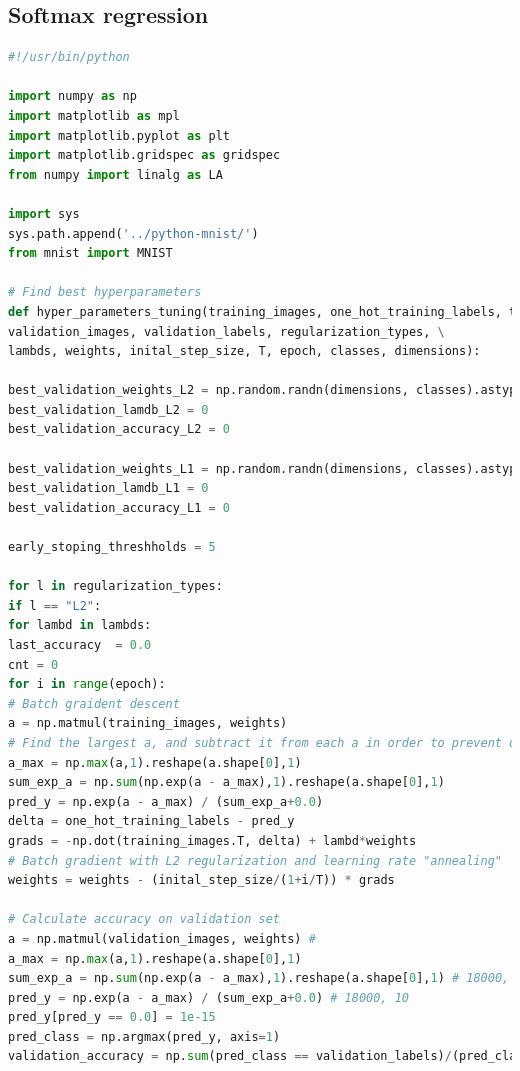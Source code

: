 \documentclass{article} %
\begin{document}
{\begin{lstlisting}[language=Python]
\end{lstlisting}

\subsection{Softmax regression}
\begin{lstlisting}[language=Python]
#!/usr/bin/python 

import numpy as np
import matplotlib as mpl
import matplotlib.pyplot as plt
import matplotlib.gridspec as gridspec
from numpy import linalg as LA

import sys
sys.path.append('../python-mnist/')
from mnist import MNIST

# Find best hyperparameters 
def hyper_parameters_tuning(training_images, one_hot_training_labels, test_images, test_labels, \
validation_images, validation_labels, regularization_types, \
lambds, weights, inital_step_size, T, epoch, classes, dimensions):

best_validation_weights_L2 = np.random.randn(dimensions, classes).astype(np.float32) 
best_validation_lamdb_L2 = 0
best_validation_accuracy_L2 = 0

best_validation_weights_L1 = np.random.randn(dimensions, classes).astype(np.float32) 
best_validation_lamdb_L1 = 0
best_validation_accuracy_L1 = 0

early_stoping_threshholds = 5

for l in regularization_types:
if l == "L2":
for lambd in lambds:
last_accuracy  = 0.0
cnt = 0
for i in range(epoch):
# Batch graident descent
a = np.matmul(training_images, weights) 
# Find the largest a, and subtract it from each a in order to prevent overflow
a_max = np.max(a,1).reshape(a.shape[0],1)
sum_exp_a = np.sum(np.exp(a - a_max),1).reshape(a.shape[0],1) 
pred_y = np.exp(a - a_max) / (sum_exp_a+0.0) 
delta = one_hot_training_labels - pred_y 
grads = -np.dot(training_images.T, delta) + lambd*weights
# Batch gradient with L2 regularization and learning rate "annealing"
weights = weights - (inital_step_size/(1+i/T)) * grads

# Calculate accuracy on validation set
a = np.matmul(validation_images, weights) #
a_max = np.max(a,1).reshape(a.shape[0],1)
sum_exp_a = np.sum(np.exp(a - a_max),1).reshape(a.shape[0],1) # 18000, 1
pred_y = np.exp(a - a_max) / (sum_exp_a+0.0) # 18000, 10
pred_y[pred_y == 0.0] = 1e-15       
pred_class = np.argmax(pred_y, axis=1)
validation_accuracy = np.sum(pred_class == validation_labels)/(pred_class.shape[0]+0.0)


\end{lstlisting}}
\end{document}
